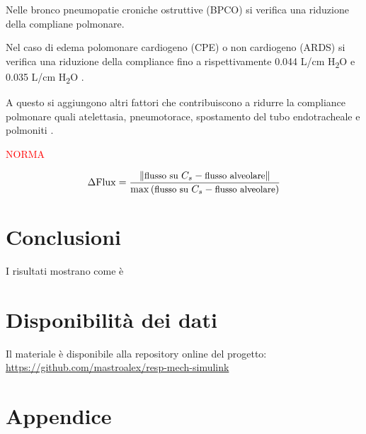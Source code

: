 Nelle bronco pneumopatie croniche ostruttive (BPCO) si verifica una riduzione della compliane polmonare.

Nel caso di edema polomonare cardiogeno (CPE) o non cardiogeno (ARDS) si verifica una riduzione della compliance fino a rispettivamente 0.044 L/cm H\textsubscript{2}O e 0.035 L/cm H\textsubscript{2}O \cite{milic-emili_basics_1999}.

A questo si aggiungono altri fattori che contribuiscono a ridurre la compliance polmonare quali atelettasia, pneumotorace, spostamento del tubo endotracheale e polmoniti \cite{grossbach_overview_2011}.


\textcolor{red}{NORMA}

\begin{equation}
	\small{
\Delta \mathrm{Flux}={	\|\text{flusso su }C_s - \text{flusso alveolare}\|\over \max\left(\text{flusso su }C_s - \text{flusso alveolare}\right)}}
\end{equation}

\section{Conclusioni}

I risultati mostrano come è 

\textcolor{blue}{
	\lipsum[1-2]
}
\section*{Disponibilità dei dati}

Il materiale è disponibile alla repository online del progetto: \url{https://github.com/mastroalex/resp-mech-simulink}


\raggedbottom

\pagebreak
\printbibliography[title=Riferimenti]


\clearpage
\onecolumn
\section*{Appendice}
